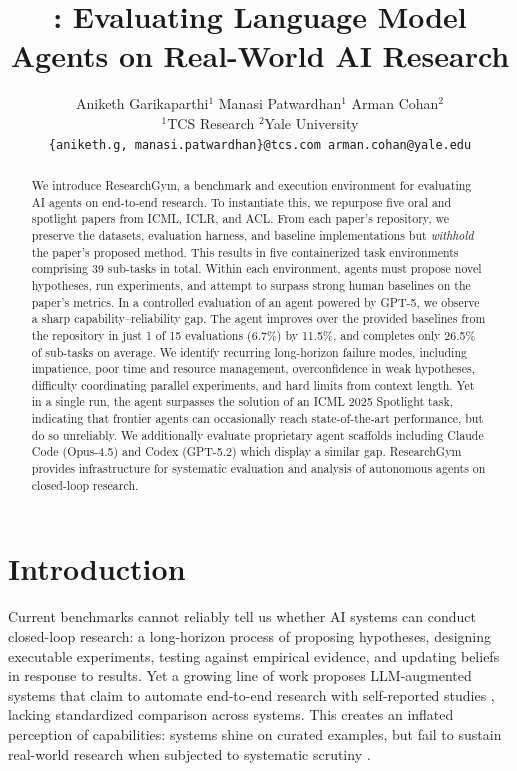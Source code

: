 \documentclass[11pt]{article}
\title{\method: Evaluating Language Model \\Agents on Real-World AI Research}
\author{
  \normalsize Aniketh Garikaparthi$^{1}$ \quad
  Manasi Patwardhan$^{1}$ \quad
  Arman Cohan$^{2}$ \\[8pt]
  \small $^{1}$TCS Research \qquad $^{2}$Yale University \\[6pt]
  \small \texttt{\{aniketh.g, manasi.patwardhan\}@tcs.com \quad arman.cohan@yale.edu}
}
\date{}
\let\cite\citep
\theoremstyle{plain}
\theoremstyle{definition}
\theoremstyle{remark}
\begin{document}
\maketitle

\begin{abstract} 
We introduce ResearchGym, a benchmark and execution environment for evaluating AI agents on end-to-end research. To instantiate this, we repurpose five oral and spotlight papers from ICML, ICLR, and ACL. From each paper's repository, we preserve the datasets, evaluation harness, and baseline implementations but \emph{withhold} the paper’s proposed method. This results in five containerized task environments comprising 39 sub-tasks in total. Within each environment, agents must propose novel hypotheses, run experiments, and attempt to surpass strong human baselines on the paper's metrics. In a controlled evaluation of an agent powered by GPT-5, we observe a sharp capability–reliability gap. The agent improves over the provided baselines from the repository in just 1 of 15 evaluations (6.7\%) by 11.5\%, and completes only 26.5\% of sub-tasks on average. We identify recurring long-horizon failure modes, including impatience, poor time and resource management, overconfidence in weak hypotheses, difficulty coordinating parallel experiments, and hard limits from context length. Yet in a single run, the agent surpasses the solution of an ICML 2025 Spotlight task, indicating that frontier agents can occasionally reach state-of-the-art performance, but do so unreliably. We additionally evaluate proprietary agent scaffolds including Claude Code (Opus-4.5) and Codex (GPT-5.2) which display a similar gap. ResearchGym provides infrastructure for systematic evaluation and analysis of autonomous agents on closed-loop research.
\end{abstract}

\vspace{-1em}


\section{Introduction}
\label{sec:intro}

Current benchmarks cannot reliably tell us whether AI systems can conduct closed-loop research: a long-horizon process of proposing hypotheses, designing executable experiments, testing against empirical evidence, and updating beliefs in response to results. Yet a growing line of work proposes LLM-augmented systems that claim to automate end-to-end research with self-reported studies \cite{lu2024aiscientistfullyautomated, tang2025airesearcherautonomousscientificinnovation, yamada2025aiscientistv2workshoplevelautomated, weng2025deepscientistadvancingfrontierpushingscientific}, lacking standardized comparison across systems. This creates an inflated perception of capabilities: systems shine on curated examples, but fail to sustain real-world research when subjected to systematic scrutiny \cite{si2025ideationexecutiongapexecutionoutcomes, zhu2025aiscientistsfailstrong}.
\end{document}

